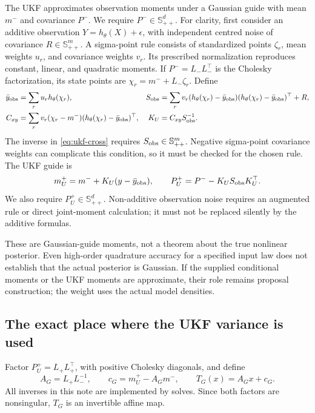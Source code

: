 \documentclass[11pt,a4paper]{article}
\newcommand{\SPD}{\mathbb S_{++}}
\begin{document}
The UKF approximates observation moments under a Gaussian guide with mean
\(m^-\) and covariance \(P^-\). We require \(P^-\in\SPD^d\).
For clarity, first consider an additive observation
\(Y=h_\theta(X)+\epsilon\), with independent centred noise of covariance
\(R\in\SPD^m\). A sigma-point rule consists of standardized points
\(\zeta_r\), mean weights \(u_r\), and covariance weights \(v_r\).
Its prescribed normalization reproduces constant, linear, and quadratic
moments. If \(P^-=L_-L_-^\top\) is the Cholesky factorization, its state
points are \(\chi_r=m^-+L_-\zeta_r\). Define
\begin{align}
\label{eq:ukf-observation}
 \bar y_{\rm obs}&=\sum_r u_r h_\theta(\chi_r),&
 S_{\rm obs}&=\sum_r v_r(h_\theta(\chi_r)-\bar y_{\rm obs})
                  (h_\theta(\chi_r)-\bar y_{\rm obs})^\top+R,\\
\label{eq:ukf-cross}
 C_{xy}&=\sum_r v_r(\chi_r-m^-)
                  (h_\theta(\chi_r)-\bar y_{\rm obs})^\top,&
 K_U&=C_{xy}S_{\rm obs}^{-1}.
\end{align}
The inverse in \eqref{eq:ukf-cross} requires \(S_{\rm obs}\in\SPD^m\).
Negative sigma-point covariance weights can complicate this condition, so it
must be checked for the chosen rule. The UKF guide is
\begin{equation}
\label{eq:ukf-update}
 m_U^+=m^-+K_U(y-\bar y_{\rm obs}),\qquad
 P_U^+=P^- - K_US_{\rm obs}K_U^\top.
\end{equation}
We also require \(P_U^+\in\SPD^d\). Non-additive observation noise requires
an augmented rule or direct joint-moment calculation; it must not be
replaced silently by the additive formulas.

These are Gaussian-guide moments, not a theorem about the true nonlinear
posterior. Even high-order quadrature accuracy for a specified input law
does not establish that the actual posterior is Gaussian. If the supplied
conditional moments or the UKF moments are approximate, their role remains
proposal construction; the weight uses the actual model densities.

\subsection{The exact place where the UKF variance is used}

Factor \(P_U^+=L_+L_+^\top\), with positive Cholesky diagonals, and define
\begin{equation}
\label{eq:global-map}
 A_G=L_+L_-^{-1},\qquad c_G=m_U^+-A_Gm^-,
 \qquad T_G(x)=A_Gx+c_G .
\end{equation}
All inverses in this note are implemented by solves. Since both factors
are nonsingular, \(T_G\) is an invertible affine map.
\end{document}
